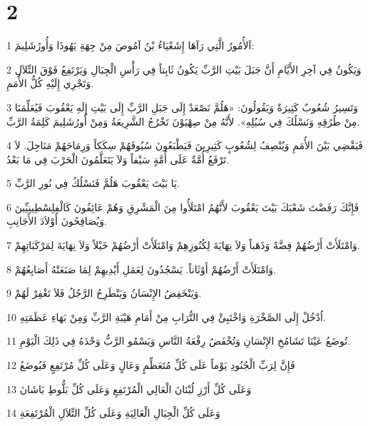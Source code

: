 \chapter{2}

\par 1 اَلأُمُورُ الَّتِي رَآهَا إِشَعْيَاءُ بْنُ آمُوصَ مِنْ جِهَةِ يَهُوذَا وَأُورُشَلِيمَ:
\par 2 وَيَكُونُ فِي آخِرِ الأَيَّامِ أَنَّ جَبَلَ بَيْتِ الرَّبِّ يَكُونُ ثَابِتاً فِي رَأْسِ الْجِبَالِ وَيَرْتَفِعُ فَوْقَ التِّلاَلِ وَتَجْرِي إِلَيْهِ كُلُّ الأُمَمِ.
\par 3 وَتَسِيرُ شُعُوبٌ كَثِيرَةٌ وَيَقُولُونَ: «هَلُمَّ نَصْعَدْ إِلَى جَبَلِ الرَّبِّ إِلَى بَيْتِ إِلَهِ يَعْقُوبَ فَيُعَلِّمَنَا مِنْ طُرُقِهِ وَنَسْلُكَ فِي سُبُلِهِ». لأَنَّهُ مِنْ صِهْيَوْنَ تَخْرُجُ الشَّرِيعَةُ وَمِنْ أُورُشَلِيمَ كَلِمَةُ الرَّبِّ.
\par 4 فَيَقْضِي بَيْنَ الأُمَمِ وَيُنْصِفُ لِشُعُوبٍ كَثِيرِينَ فَيَطْبَعُونَ سُيُوفَهُمْ سِكَكاً وَرِمَاحَهُمْ مَنَاجِلَ. لاَ تَرْفَعُ أُمَّةٌ عَلَى أُمَّةٍ سَيْفاً وَلاَ يَتَعَلَّمُونَ الْحَرْبَ فِي مَا بَعْدُ.
\par 5 يَا بَيْتَ يَعْقُوبَ هَلُمَّ فَنَسْلُكُ فِي نُورِ الرَّبِّ.
\par 6 فَإِنَّكَ رَفَضْتَ شَعْبَكَ بَيْتَ يَعْقُوبَ لأَنَّهُمُ امْتَلَأُوا مِنَ الْمَشْرِقِ وَهُمْ عَائِفُونَ كَالْفِلِسْطِينِيِّينَ وَيُصَافِحُونَ أَوْلاَدَ الأَجَانِبِ.
\par 7 وَامْتَلَأَتْ أَرْضُهُمْ فِضَّةً وَذَهَباً وَلاَ نِهَايَةَ لِكُنُوزِهِمْ وَامْتَلَأَتْ أَرْضُهُمْ خَيْلاً وَلاَ نِهَايَةَ لِمَرْكَبَاتِهِمْ.
\par 8 وَامْتَلَأَتْ أَرْضُهُمْ أَوْثَاناً. يَسْجُدُونَ لِعَمَلِ أَيْدِيهِمْ لِمَا صَنَعَتْهُ أَصَابِعُهُمْ.
\par 9 وَيَنْخَفِضُ الإِنْسَانُ وَيَنْطَرِحُ الرَّجُلُ فَلاَ تَغْفِرْ لَهُمْ.
\par 10 اُدْخُلْ إِلَى الصَّخْرَةِ وَاخْتَبِئْ فِي التُّرَابِ مِنْ أَمَامِ هَيْبَةِ الرَّبِّ وَمِنْ بَهَاءِ عَظَمَتِهِ.
\par 11 تُوضَعُ عَيْنَا تَشَامُخِ الإِنْسَانِ وَتُخْفَضُ رِفْعَةُ النَّاسِ وَيَسْمُو الرَّبُّ وَحْدَهُ فِي ذَلِكَ الْيَوْمِ.
\par 12 فَإِنَّ لِرَبِّ الْجُنُودِ يَوْماً عَلَى كُلِّ مُتَعَظِّمٍ وَعَالٍ وَعَلَى كُلِّ مُرْتَفِعٍ فَيُوضَعُ
\par 13 وَعَلَى كُلِّ أَرْزِ لُبْنَانَ الْعَالِي الْمُرْتَفِعِ وَعَلَى كُلِّ بَلُّوطِ بَاشَانَ
\par 14 وَعَلَى كُلِّ الْجِبَالِ الْعَالِيَةِ وَعَلَى كُلِّ التِّلاَلِ الْمُرْتَفِعَةِ

